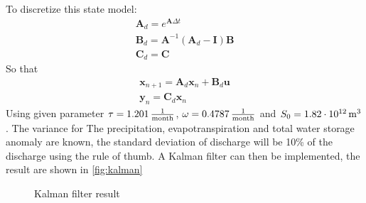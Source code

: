 To discretize this state model:
\begin{gather*}
	\bm{A}_d = e^{\bm{A} \Delta t} \\
	\bm{B}_d = \bm{A}^{-1}\left(\bm{A}_d-\bm{I}\right)\bm{B} \\
	\bm{C}_d = \bm{C}
\end{gather*}
So that 
\begin{gather*}
	\bm{x}_{n+1} = \bm{A}_d \bm{x}_{n}+ \bm{B}_d \bm{u} \\
	\bm{y}_n = \bm{C}_d\bm{x}_{n} 
\end{gather*}
Using given parameter $\tau=1.201 \,\mathrm{\frac{1}{month}}$, $\omega = 0.4787 \,\mathrm{\frac{1}{month}}$ and $S_0 = 1.82 \cdot 10^{12} \,\mathrm{m^3}$. The variance for The precipitation, evapotranspiration and total water storage anomaly are known, the standard deviation of discharge will be 10\% of the discharge using the rule of thumb. A Kalman filter can then be implemented, the result are shown in \autoref{fig:kalman}
\begin{figure}[htpb]\centering
	\caption{Kalman filter result}
	\label{fig:kalman}
\end{figure}
